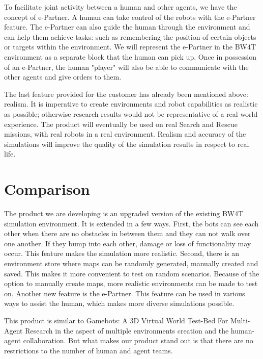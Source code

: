 \documentclass[a4paper]{article}
\begin{document}
To facilitate joint activity between a human and other agents, we have the concept of e-Partner. A human can take control of the robots with the e-Partner feature. The e-Partner can also guide the human through the environment and can help them achieve tasks: such as remembering the position of certain objects or targets within the environment. We will represent the e-Partner in the BW4T environment as a separate block that the human can pick up. Once in possession of an e-Partner, the human "player" will also be able to communicate with the other agents and give orders to them.

The last feature provided for the customer has already been mentioned above: realism. It is imperative to create environments and robot capabilities as realistic as possible; otherwise research results would not be representative of a real world experience. The product will eventually be used on real Search and Rescue missions, with real robots in a real environment. Realism and accuracy of the simulations will improve the quality of the simulation results in respect to real life. 

\section{Comparison}
The product we are developing is an upgraded version of the existing BW4T simulation environment. It is extended in a few ways. First, the bots can see each other when there are no obstacles in between them and they can not walk over one another. If they bump into each other, damage or loss of functionality may occur. This feature makes the simulation more realistic. Second, there is an environment store where maps can be randomly generated, manually created and saved. This makes it more convenient to test on random scenarios. Because of the option to manually create maps, more realistic environments can be made to test on. Another new feature is the e-Partner. This feature can be used in various ways to assist the human, which makes more diverse simulations possible.

This product is similar to Gamebots: A 3D Virtual World Test-Bed For Multi-Agent Research \cite{adobbati2001gamebots} in the aspect of multiple environments creation and the human-agent collaboration. But what makes our product stand out is that there are no restrictions to the number of human and agent teams.
\end{document}
